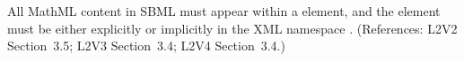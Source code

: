 All MathML content in SBML must appear within a 
element, and the  element must be either explicitly or
implicitly in the XML namespace
.  (References: L2V2
Section~3.5; L2V3 Section~3.4; L2V4 Section~3.4.)
